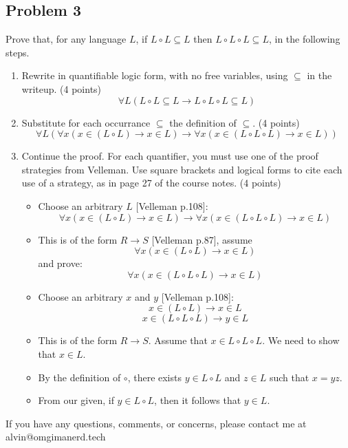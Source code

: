 \documentclass{math}
\begin{document}
\subsection*{Problem 3}
Prove that, for any language \( L \), if \( L\circ L \subseteq L \) then
\( L \circ L \circ L \subseteq L \), in the following steps.
\begin{enumerate}
  \item Rewrite in quantifiable logic form, with no free variables, using
    \( \subseteq \) in the writeup. (4 points)
    \[ \forall{L}(L\circ L\subseteq L \to L\circ L\circ L\subseteq L) \]
  \item Substitute for each occurrance \( \subseteq \) the definition of
    \( \subseteq \). (4 points)
    \[ \forall{L}(\forall{x}(x\in(L\circ L)\to x\in L)\to
      \forall{x}(x\in(L\circ L\circ L)\to x\in L)) \]
  \item Continue the proof. For each quantifier, you must use one of the proof
    strategies from Velleman. Use square brackets and logical forms to cite
    each use of a strategy, as in page 27 of the course notes. (4 points)
    \begin{itemize}
      \item Choose an arbitrary \( L \) [Velleman p.108]:
      \[ \forall{x}(x\in(L\circ L)\to x\in L)\to
        \forall{x}(x\in(L\circ L\circ L)\to x\in L) \]
      \item This is of the form \( R\to S \) [Velleman p.87], assume
      \[ \forall{x}(x\in(L\circ L)\to x\in L) \]
      and prove:
      \[ \forall{x}(x\in(L\circ L\circ L)\to x\in L) \]
      \item Choose an arbitrary \( x \) and \( y \) [Velleman p.108]:
      \[ x\in(L\circ L)\to x\in L \]
      \[ x\in(L\circ L\circ L)\to y\in L \]
      \item This is of the form \( R\to S \). Assume that
        \( x\in L\circ L\circ L \). We need to show that \( x\in L \).
      \item By the definition of \( \circ \), there exists \( y\in L\circ L \)
        and \( z\in L \) such that \( x = yz \).
      \item From our given, if \( y\in L\circ L \), then it follows that
        \( y\in L \).
    \end{itemize}
\end{enumerate}

\begin{center}
  If you have any questions, comments, or concerns, please contact me at
  alvin@omgimanerd.tech
\end{center}
\end{document}
